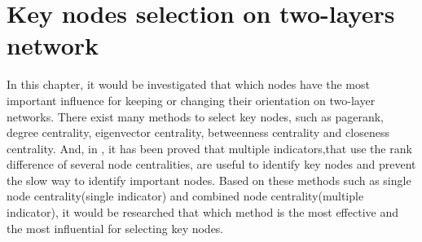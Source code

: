 
\chapter{Key nodes selection on two-layers network}
\label{chap5}
In this chapter, it would be investigated that which nodes have the most important influence for keeping or changing their orientation on two-layer networks. There exist many methods to select key nodes, such as pagerank, degree centrality, eigenvector centrality, betweenness centrality and closeness centrality. And, in \parencite{mesgari2015, huang2014}, it has been proved that multiple indicators,that use the rank difference of several node centralities, are useful to identify key nodes and prevent the slow way to identify important nodes. Based on these methods such as single node centrality(single indicator) and combined node centrality(multiple indicator), it would be researched that which method is the most effective and the most influential for selecting key nodes.  

